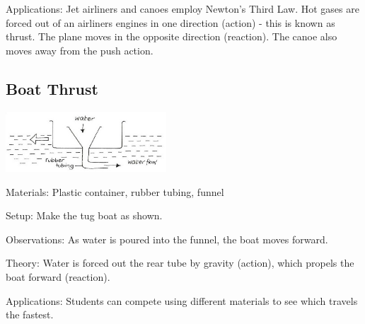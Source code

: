 \begin{multicols}{2}
\begin{description*}
\item[Applications:]{Jet airliners and canoes employ Newton's Third Law. Hot gases are forced out of an airliners engines in one direction (action) - this is known as thrust. The plane moves in the opposite direction (reaction). The canoe also moves away from the push action.}
\end{description*}

\subsection{Boat Thrust}

\begin{center}
\includegraphics[width=0.45\textwidth]{./img/vso/boat-thrust.jpg}
\end{center}

\begin{description*}
\item[Materials:]{Plastic container, rubber tubing, funnel}
\item[Setup:]{Make the tug boat as shown. }
\item[Observations:]{As water is poured into the funnel, the boat moves forward.}
\item[Theory:]{Water is forced out the rear tube by gravity (action), which propels the boat forward (reaction).}
\item[Applications:]{Students can compete using different materials to see which travels the fastest.}
\end{description*}


\end{multicols}
